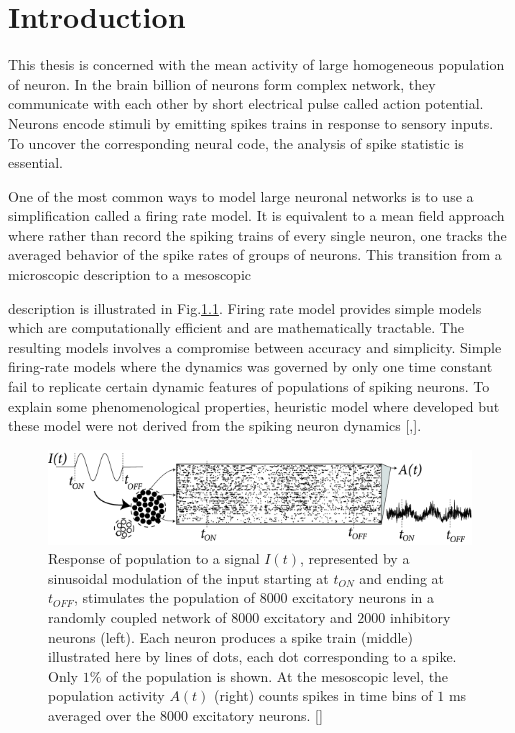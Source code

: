 \documentclass[12pt,twoside]{report}
\begin{document}
\chapter{Introduction}
\setcounter{page}{1}

\label{sec:intro}


This thesis is concerned with the mean activity of large homogeneous population of neuron. In the brain billion of neurons form complex network, they communicate with each other by short electrical pulse called action potential. Neurons encode stimuli by emitting spikes trains in response to sensory inputs. To uncover the corresponding neural code, the analysis of spike statistic is essential. 

One of the most common ways to model large neuronal networks is to use a simplification called a firing rate model. It is equivalent to a mean field approach where rather than record the spiking trains of every single neuron, one tracks the averaged behavior of the spike rates of groups of neurons. This transition from a microscopic description to a mesoscopic %

description is illustrated in Fig.\ref{fig:x285}. Firing rate model provides simple models which are computationally efficient and are mathematically tractable. The resulting models involves a compromise between accuracy and simplicity. Simple firing-rate models where the dynamics was governed by only one time constant fail to replicate certain dynamic features of populations of spiking neurons. To explain some phenomenological properties, heuristic model where developed but these model were not derived from the spiking neuron dynamics [\cite{WilCow72},\cite{OstBru11}]. 



\begin{figure}[h!]
	\centering
	\includegraphics[width=0.8\linewidth]{x285.png}
	\caption{ Response of population to a signal $I(t)$, represented by a sinusoidal modulation of the input starting at $t_{ON}$ and ending at $t_{OFF}$, stimulates the population of $8 000$ excitatory neurons in a randomly coupled network of $8 000$ excitatory and $2 000$ inhibitory neurons (left). Each neuron produces a spike train (middle) illustrated here by lines of dots, each dot corresponding to a spike.  Only $1\%$ of the population is shown. At the mesoscopic level, the population activity $A(t)$ (right) counts spikes in time bins of $1$ ms averaged over the $8 000$ excitatory neurons. [\cite{GerKis14}] }
	\label{fig:x285}
\end{figure}
\end{document}
